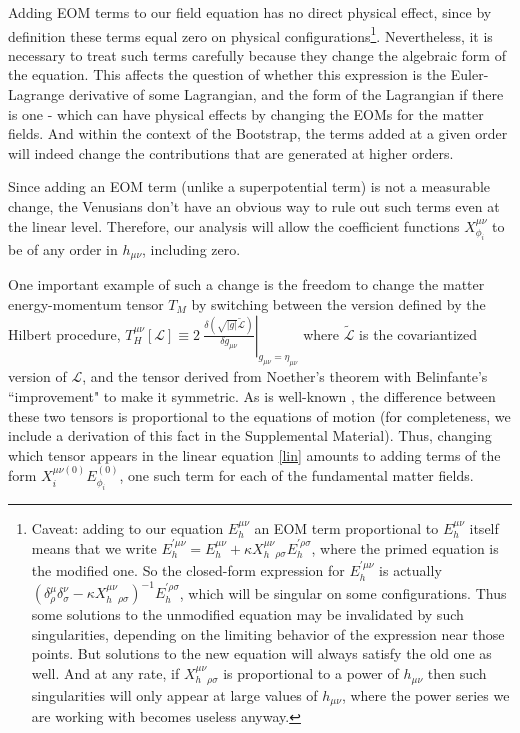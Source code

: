 \documentclass[aps,physrev,preprint,groupedaddress]{revtex4-2}
\begin{document}
Adding EOM terms to our field equation has no direct physical effect, since by definition these terms equal zero on physical configurations\footnote{Caveat: adding to our equation \(E_h^{\mu\nu}\) an EOM term proportional to \(E_h^{\mu\nu}\) itself means that we write \( E_h^{'\mu\nu}=E_h^{\mu\nu}+\kappa X_h^{\mu\nu}{}_{\rho\sigma}E_h^{'\rho\sigma}\), where the primed equation is the modified one. So the closed-form expression for \(E_h^{'\mu\nu}\) is actually \(\left(\delta^\mu_\rho\delta^\nu_\sigma-\kappa X_h^{\mu\nu}{}_{\rho\sigma}\right)^{-1}E_h^{'\rho\sigma}\), which will be singular on some configurations. Thus some solutions to the unmodified equation may be invalidated by such singularities, depending on the limiting behavior of the expression near those points. But solutions to the new equation will always satisfy the old one as well. And at any rate, if \(X_h^{\mu\nu}{}_{\rho\sigma}\) is proportional to a power of \(h_{\mu\nu}\) then such singularities will only appear at large values of \(h_{\mu\nu}\), where the power series we are working with becomes useless anyway.}. Nevertheless, it is necessary to treat such terms carefully because they change the algebraic form of the equation. This affects the question of whether this expression is the Euler-Lagrange derivative of some Lagrangian, and the form of the Lagrangian if there is one - which can have physical effects by changing the EOMs for the matter fields. And within the context of the Bootstrap, the terms added at a given order will indeed change the contributions that are generated at higher orders.

Since adding an EOM term (unlike a superpotential term) is not a measurable change, the Venusians don't have an obvious way to rule out such terms even at the linear level. Therefore, our analysis will allow the coefficient functions \(X_{\phi_i}^{\mu\nu}\) to be of any order in \(h_{\mu\nu}\), including zero.

One important example of such a change is the freedom to change the matter energy-momentum tensor \(T_M\) by switching between the version defined by the Hilbert procedure, 
\(T_{H}^{\mu\nu}\left\lbrack \mathcal{L} \right\rbrack \equiv 2\left. \ \frac{\delta(\sqrt{|g|}\widetilde{\mathcal{L}})}{\delta g_{\mu\nu}} \right|_{g_{\mu\nu} = \eta_{\mu\nu}}\) where \(\widetilde{\mathcal{L}}\) is the covariantized version of \(\mathcal{L}\), and the tensor derived from Noether's theorem with Belinfante's ``improvement" to make it symmetric. As is well-known \cite{Rosenfeld}, the difference between these two tensors is proportional to the equations of motion (for completeness, we include a derivation of this  fact in the Supplemental Material). Thus, changing which tensor appears in the linear equation \eqref{lin} amounts to adding terms of the form \( X^{\mu\nu(0)}_i E_{\phi_i}^{(0)}\), one such term for each of the fundamental matter fields. 
\end{document}
